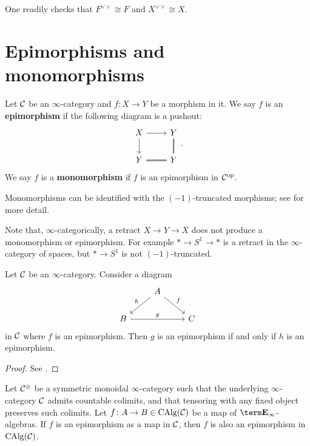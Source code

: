 \documentclass[10pt,a4paper,oneside]{article}
\begin{document}
\begin{rem}
One readily checks that $F^{\vee\vee} \cong F$ and $X^{\vee\vee} \cong X$.
\end{rem}

\section{Epimorphisms and monomorphisms}
\begin{de}
Let $\mathcal{C}$ be an $\infty$-category and $f:X\to Y$ be a morphism in it. We say $f$ is an \textbf{epimorphism} if the following diagram is a pushout:
$$\begin{tikzcd}
X \arrow[d] \arrow[r] & {Y} \arrow[d, double, no head] \\ %
{Y} \arrow[r, double, no head] & {Y} %
\end{tikzcd}.$$
We say $f$ is a \textbf{monomorphism} if $f$ is an epimorphism in $\mathcal{C}^{\operatorname{op}}$.
\end{de}
\begin{rem}
Monomorphisms can be identified with the $(-1)$-truncated morphisms; see \cite[.6]{htt} for more detail.
\end{rem}
\begin{rem}
Note that, $\infty$-categorically, a retract $X\to Y \to X$ does not produce a monomorphism or epimorphism. For example $*\to S^1 \to *$ is a retract in the $\infty$-category of spaces, but $*\to S^1$ is not $(-1)$-truncated.
\end{rem}
\begin{prop}
Let $\mathcal{C}$ be an $\infty$-category. Consider a diagram $$\begin{tikzcd}
& A \arrow[rd, "f"] \arrow[ld, "h"'] &   \\
B \arrow[rr, "g"] &                                    & C
\end{tikzcd}$$
in $\mathcal{C}$ where $f$ is an epimorphism. Then $g$ is an epimorphism if and only if $h$ is an epimorphism.
\end{prop}
\begin{proof}
See \cite[Lemma 5.5.6.14]{htt}.
\end{proof}

\begin{prop}\label{calgepi}
Let $\mathcal{C}^\otimes$ be a symmetric monoidal $\infty$-category such that the underlying $\infty$-category $\mathcal{C}$ admits countable colimits, and that tensoring with any fixed object preserves such colimits. Let $f\colon A\to B \in \operatorname{CAlg}(\mathcal{C})$ be a map of $\einf$-algebras. If $f$ is an epimorphism as a map in $\mathcal{C}$, then $f$ is also an epimorphism in $\operatorname{CAlg}(\mathcal{C})$.
\end{prop}
\end{document}
